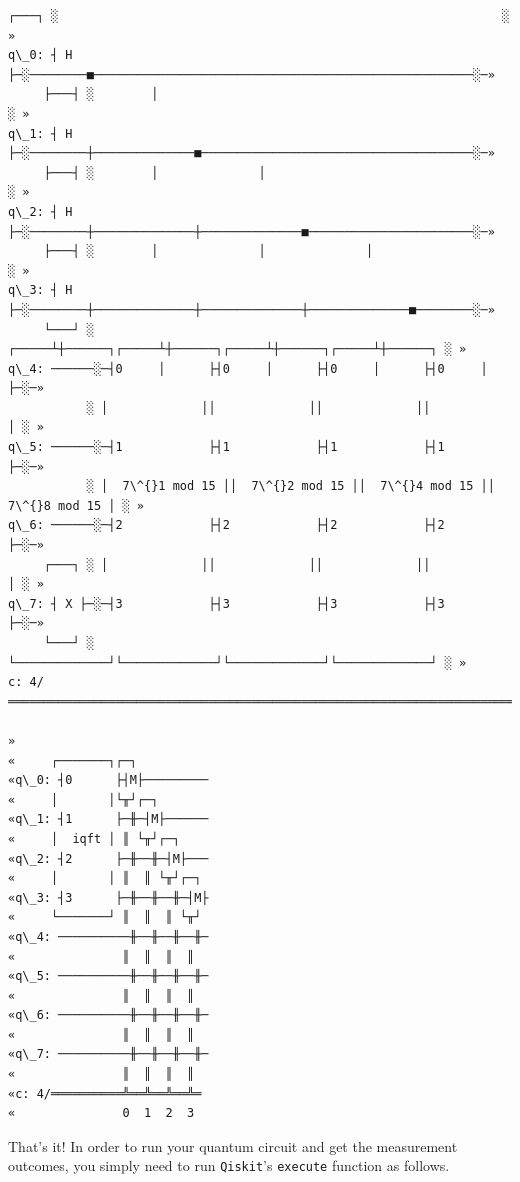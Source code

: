 \documentclass[11pt]{article}
\makeatletter
\newcommand{\boxspacing}{\kern\kvtcb@left@rule\kern\kvtcb@boxsep}
\newcommand{\prompt}[4]{
        \ttfamily\llap{{\color{#2}[#3]:\hspace{3pt}#4}}\vspace{-\baselineskip}
    }
\makeatother
\begin{document}
            \begin{tcolorbox}[breakable, size=fbox, boxrule=.5pt, pad at break*=1mm, opacityfill=0]
\prompt{Out}{outcolor}{37}{\boxspacing}
\begin{Verbatim}[commandchars=\\\{\}]
     ┌───┐ ░                                                              ░ »
q\_0: ┤ H ├─░────────■─────────────────────────────────────────────────────░─»
     ├───┤ ░        │                                                     ░ »
q\_1: ┤ H ├─░────────┼──────────────■──────────────────────────────────────░─»
     ├───┤ ░        │              │                                      ░ »
q\_2: ┤ H ├─░────────┼──────────────┼──────────────■───────────────────────░─»
     ├───┤ ░        │              │              │                       ░ »
q\_3: ┤ H ├─░────────┼──────────────┼──────────────┼──────────────■────────░─»
     └───┘ ░ ┌─────┴┼──────┐┌─────┴┼──────┐┌─────┴┼──────┐┌─────┴┼──────┐ ░ »
q\_4: ──────░─┤0     │      ├┤0     │      ├┤0     │      ├┤0     │      ├─░─»
           ░ │             ││             ││             ││             │ ░ »
q\_5: ──────░─┤1            ├┤1            ├┤1            ├┤1            ├─░─»
           ░ │  7\^{}1 mod 15 ││  7\^{}2 mod 15 ││  7\^{}4 mod 15 ││  7\^{}8 mod 15 │ ░ »
q\_6: ──────░─┤2            ├┤2            ├┤2            ├┤2            ├─░─»
     ┌───┐ ░ │             ││             ││             ││             │ ░ »
q\_7: ┤ X ├─░─┤3            ├┤3            ├┤3            ├┤3            ├─░─»
     └───┘ ░ └─────────────┘└─────────────┘└─────────────┘└─────────────┘ ░ »
c: 4/═══════════════════════════════════════════════════════════════════════»
                                                                            »
«     ┌───────┐┌─┐
«q\_0: ┤0      ├┤M├─────────
«     │       │└╥┘┌─┐
«q\_1: ┤1      ├─╫─┤M├──────
«     │  iqft │ ║ └╥┘┌─┐
«q\_2: ┤2      ├─╫──╫─┤M├───
«     │       │ ║  ║ └╥┘┌─┐
«q\_3: ┤3      ├─╫──╫──╫─┤M├
«     └───────┘ ║  ║  ║ └╥┘
«q\_4: ──────────╫──╫──╫──╫─
«               ║  ║  ║  ║
«q\_5: ──────────╫──╫──╫──╫─
«               ║  ║  ║  ║
«q\_6: ──────────╫──╫──╫──╫─
«               ║  ║  ║  ║
«q\_7: ──────────╫──╫──╫──╫─
«               ║  ║  ║  ║
«c: 4/══════════╩══╩══╩══╩═
«               0  1  2  3
\end{Verbatim}
\end{tcolorbox}
        
    That's it! In order to run your quantum circuit and get the measurement
outcomes, you simply need to run \texttt{Qiskit}'s \texttt{execute}
function as follows.
\end{document}
